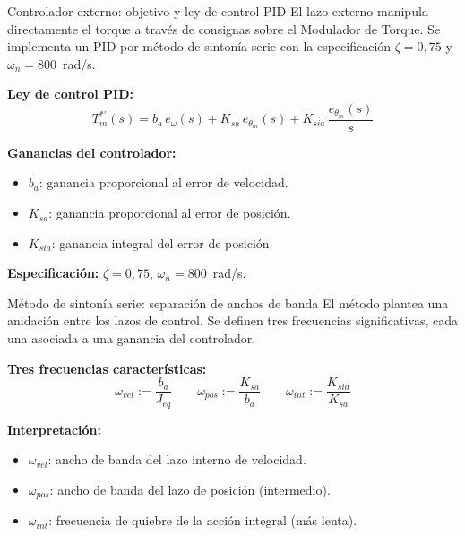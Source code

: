 \documentclass[aspectratio=169,t]{beamer}
\begin{document}
\begin{frame}{Controlador externo: objetivo y ley de control PID}
{\small\color{uncGray}El lazo externo manipula directamente el torque a través de consignas sobre el Modulador de Torque. Se implementa un PID por método de sintonía serie con la especificación $\zeta=0{,}75$ y $\omega_n=800$~rad/s.}\par
\vspace{4mm}

\textbf{Ley de control PID:}
\begin{equation*}
T_m^{*\prime}(s) = b_a\,e_\omega(s) + K_{sa}\,e_{\theta_m}(s) + K_{sia}\,\frac{e_{\theta_m}(s)}{s}
\end{equation*}

\textbf{Ganancias del controlador:}
\begin{itemize}
\item $b_a$: ganancia proporcional al error de velocidad.
\item $K_{sa}$: ganancia proporcional al error de posición.
\item $K_{sia}$: ganancia integral del error de posición.
\end{itemize}

\vspace{2mm}
\textbf{Especificación:} $\zeta = 0{,}75$, $\omega_n = 800$~rad/s.
\end{frame}

\begin{frame}{Método de sintonía serie: separación de anchos de banda}
{\small\color{uncGray}El método plantea una anidación entre los lazos de control. Se definen tres frecuencias significativas, cada una asociada a una ganancia del controlador.}\par
\vspace{6mm}

\textbf{Tres frecuencias características:}
\begin{equation*}
\omega_{vel} := \frac{b_a}{J_{eq}}
\qquad
\omega_{pos} := \frac{K_{sa}}{b_a}
\qquad
\omega_{int} := \frac{K_{sia}}{K_{sa}}
\end{equation*}

\vspace{6mm}
\textbf{Interpretación:}
\begin{itemize}
\item $\omega_{vel}$: ancho de banda del lazo interno de velocidad.
\item $\omega_{pos}$: ancho de banda del lazo de posición (intermedio).
\item $\omega_{int}$: frecuencia de quiebre de la acción integral (más lenta).
\end{itemize}
\end{frame}
\end{document}
